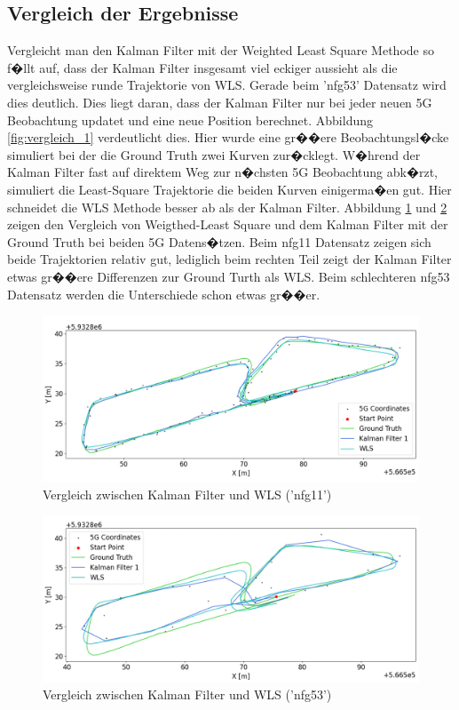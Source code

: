 \subsection{Vergleich der Ergebnisse}
Vergleicht man den Kalman Filter mit der Weighted Least Square Methode so f�llt auf, dass der Kalman Filter insgesamt viel eckiger aussieht als die vergleichsweise runde Trajektorie von WLS. Gerade beim 'nfg53' Datensatz wird dies deutlich. Dies liegt daran, dass der Kalman Filter nur bei jeder neuen 5G Beobachtung updatet und eine neue Position berechnet. Abbildung \ref{fig:vergleich_1} verdeutlicht dies. Hier wurde eine gr��ere Beobachtungsl�cke simuliert bei der die Ground Truth zwei Kurven zur�cklegt. W�hrend der Kalman Filter fast auf direktem Weg zur n�chsten 5G Beobachtung abk�rzt, simuliert die Least-Square Trajektorie die beiden Kurven einigerma�en gut. Hier schneidet die WLS Methode besser ab als der Kalman Filter.
Abbildung \ref{fig:vergleich_2} und \ref{fig:vergleich_3} zeigen den Vergleich von Weigthed-Least Square und dem Kalman Filter mit der Ground Truth bei beiden 5G Datens�tzen. Beim nfg11 Datensatz zeigen sich beide Trajektorien relativ gut, lediglich beim rechten Teil zeigt der Kalman Filter etwas gr��ere Differenzen zur Ground Turth als WLS. Beim schlechteren nfg53 Datensatz werden die Unterschiede schon etwas gr��er.
\begin{figure}[h!]
	\centering
	\includegraphics[width=0.8\linewidth]{source/images/vergleich_ls_kf_11}
	\caption{Vergleich zwischen Kalman Filter und WLS ('nfg11')}
	\label{fig:vergleich_2}
\end{figure}
\begin{figure}[h!]
	\centering
	\includegraphics[width=0.8\linewidth]{source/images/vergleich_ls_kf_53}
	\caption{Vergleich zwischen Kalman Filter und WLS ('nfg53')}
	\label{fig:vergleich_3}
\end{figure}

